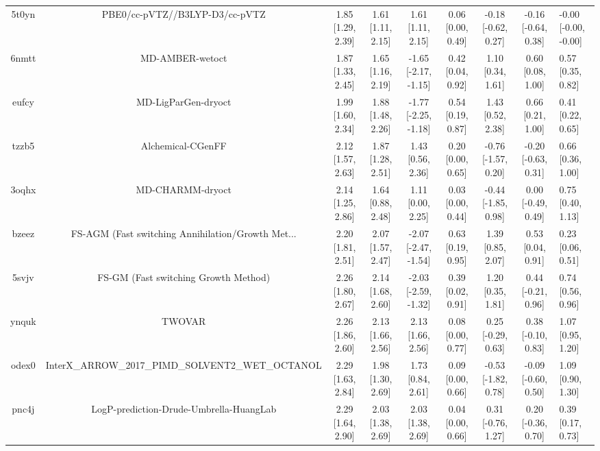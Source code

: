 \documentclass{article}
\begin{document}
\begin{center}
\begin{longtable}{|cccccccc|}
 5t0yn &                     PBE0/cc-pVTZ//B3LYP-D3/cc-pVTZ &  1.85 [1.29, 2.39] &  1.61 [1.11, 2.15] &     1.61 [1.11, 2.15] &  0.06 [0.00, 0.49] &  -0.18 [-0.62, 0.27] &  -0.16 [-0.64, 0.38] &  -0.00 [-0.00, -0.00] \\
 6nmtt &                                    MD-AMBER-wetoct &  1.87 [1.33, 2.45] &  1.65 [1.16, 2.19] &  -1.65 [-2.17, -1.15] &  0.42 [0.04, 0.92] &    1.10 [0.34, 1.61] &    0.60 [0.08, 1.00] &     0.57 [0.35, 0.82] \\
 eufcy &                                MD-LigParGen-dryoct &  1.99 [1.60, 2.34] &  1.88 [1.48, 2.26] &  -1.77 [-2.25, -1.18] &  0.54 [0.19, 0.87] &    1.43 [0.52, 2.38] &    0.66 [0.21, 1.00] &     0.41 [0.22, 0.65] \\
 tzzb5 &                                  Alchemical-CGenFF &  2.12 [1.57, 2.63] &  1.87 [1.28, 2.51] &     1.43 [0.56, 2.36] &  0.20 [0.00, 0.65] &  -0.76 [-1.57, 0.20] &  -0.20 [-0.63, 0.31] &     0.66 [0.36, 1.00] \\
 3oqhx &                                   MD-CHARMM-dryoct &  2.14 [1.25, 2.86] &  1.64 [0.88, 2.48] &     1.11 [0.00, 2.25] &  0.03 [0.00, 0.44] &  -0.44 [-1.85, 0.98] &   0.00 [-0.49, 0.49] &     0.75 [0.40, 1.13] \\
 bzeez &  FS-AGM (Fast switching Annihilation/Growth Met... &  2.20 [1.81, 2.51] &  2.07 [1.57, 2.47] &  -2.07 [-2.47, -1.54] &  0.63 [0.19, 0.95] &    1.39 [0.85, 2.07] &    0.53 [0.04, 0.91] &     0.23 [0.06, 0.51] \\
 5svjv &               FS-GM (Fast switching Growth Method) &  2.26 [1.80, 2.67] &  2.14 [1.68, 2.60] &  -2.03 [-2.59, -1.32] &  0.39 [0.02, 0.91] &    1.20 [0.35, 1.81] &   0.44 [-0.21, 0.96] &     0.74 [0.56, 0.96] \\
 ynquk &                                             TWOVAR &  2.26 [1.86, 2.60] &  2.13 [1.66, 2.56] &     2.13 [1.66, 2.56] &  0.08 [0.00, 0.77] &   0.25 [-0.29, 0.63] &   0.38 [-0.10, 0.83] &     1.07 [0.95, 1.20] \\
 odex0 &  InterX\_ARROW\_2017\_PIMD\_SOLVENT2\_WET\_OCTANOL &  2.29 [1.63, 2.84] &  1.98 [1.30, 2.69] &     1.73 [0.84, 2.61] &  0.09 [0.00, 0.66] &  -0.53 [-1.82, 0.78] &  -0.09 [-0.60, 0.50] &     1.09 [0.90, 1.30] \\
 pnc4j &            LogP-prediction-Drude-Umbrella-HuangLab &  2.29 [1.64, 2.90] &  2.03 [1.38, 2.69] &     2.03 [1.38, 2.69] &  0.04 [0.00, 0.66] &   0.31 [-0.76, 1.27] &   0.20 [-0.36, 0.70] &     0.39 [0.17, 0.73] \\

\end{longtable}
\end{center}
\end{document}
